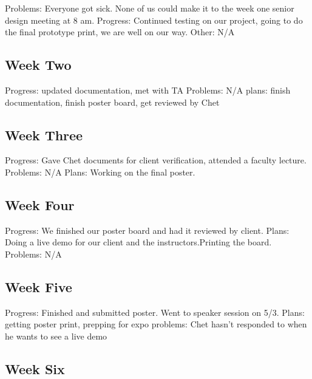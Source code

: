 \documentclass[letterpaper,10pt,draftclsnofoot,onecolumn]{article}
\begin{document}
Problems: Everyone got sick. None of us could make it to the week one senior design meeting at 8 am.
\newline
Progress: Continued testing on our project, going to do the final prototype print, we are well on our way.
\newline
Other: N/A

\subsection{Week Two}

Progress: updated documentation, met with TA
\newline 
Problems: N/A
\newline 
plans: finish documentation, finish poster board, get reviewed by Chet 


\subsection{Week Three}

Progress: Gave Chet documents for client verification, attended a faculty lecture.
\newline
Problems: N/A
\newline
Plans: Working on the final poster.

\subsection{Week Four}

Progress: We finished our poster board and had it reviewed by client.
\newline
Plans: Doing a live demo for our client and the instructors.Printing the board.
\newline
Problems: N/A

\subsection{Week Five}

Progress: Finished and submitted poster. Went to speaker session on 5/3.
\newline 
Plans: getting poster print, prepping for expo
\newline 
problems: Chet hasn’t responded to when he wants to see a live demo 

\subsection{Week Six}
\end{document}
